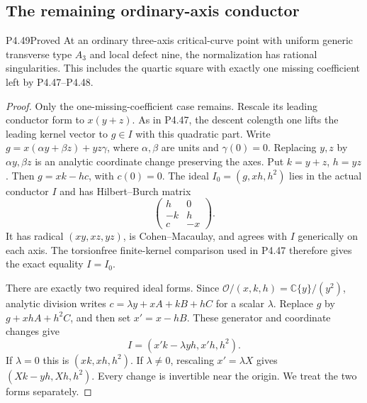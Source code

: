 \subsection{The remaining ordinary-axis conductor}

\begin{statement}{P4.49}{Proved}
At an ordinary three-axis critical-curve point with uniform
generic transverse type $A_3$ and local defect nine, the
normalization has rational singularities. This includes the
quartic square with exactly one missing coefficient left
by P4.47--P4.48.
\end{statement}
\begin{proof}
Only the one-missing-coefficient case remains. Rescale
its leading conductor form to $x(y+z)$.
As in P4.47, the descent colength one lifts the leading
kernel vector to $g\in I$ with this quadratic part.
Write $g=x(\alpha y+\beta z)+yz\gamma$, where
$\alpha,\beta$ are units and $\gamma(0)=0$.
Replacing $y,z$ by $\alpha y,\beta z$ is an analytic
coordinate change preserving the axes. Put $k=y+z$,
$h=yz$. Then $g=xk-hc$, with $c(0)=0$.
The ideal $I_0=(g,xh,h^2)$ lies in the actual conductor
$I$ and has Hilbert--Burch matrix
\[
                 \begin{pmatrix}h&0\\-k&h\\c&-x\end{pmatrix}.
\]
It has radical $(xy,xz,yz)$, is Cohen--Macaulay, and
agrees with $I$ generically on each axis. The
torsionfree finite-kernel comparison used in P4.47
therefore gives the exact equality $I=I_0$.

There are exactly two required ideal forms. Since
$\mathcal O/(x,k,h)=\mathbb C\{y\}/(y^2)$, analytic
division writes $c=\lambda y+xA+kB+hC$ for a scalar
$\lambda$. Replace $g$ by $g+xhA+h^2C$, and then
set $x'=x-hB$. These generator and coordinate changes
give
\[
                    I=(x'k-\lambda yh,x'h,h^2).
\]
If $\lambda=0$ this is $(xk,xh,h^2)$. If
$\lambda\ne0$, rescaling $x'=\lambda X$ gives
$(Xk-yh,Xh,h^2)$. Every change is invertible near
the origin. We treat the two forms separately.


\end{proof}
